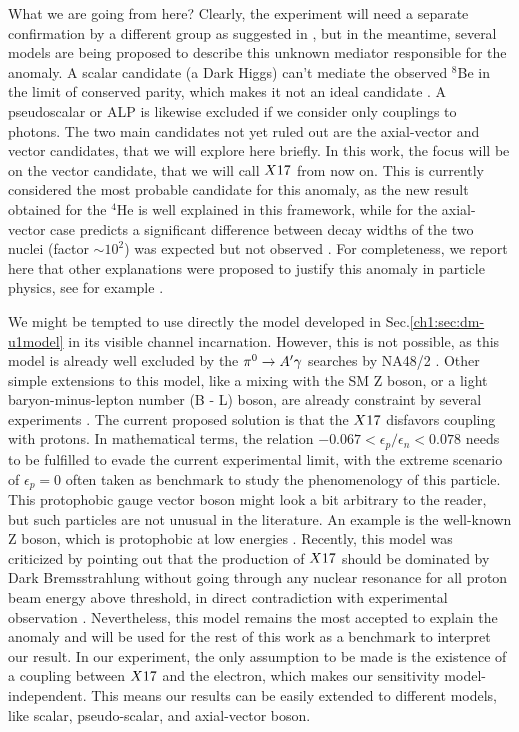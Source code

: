 What we are going from here? Clearly, the experiment will need a separate confirmation by a different group as suggested in \cite{Feng:2020mbt}, but in the meantime, several models are being proposed to describe this unknown mediator responsible for the anomaly. A scalar candidate (a Dark Higgs) can't mediate the observed $^8$Be in the limit of conserved parity, which makes it not an ideal candidate \cite{PhysRevD.95.035017}. A pseudoscalar or ALP is likewise excluded if we consider only couplings to photons. The two main candidates not yet ruled out are the axial-vector and vector candidates, that we will explore here briefly. In this work, the focus will be on the vector candidate, that we will call $X17$ from now on. This is currently considered the most probable candidate for this anomaly, as the new result obtained for the $^4$He is well explained in this framework, while for the axial-vector case predicts a significant difference between decay widths of the two nuclei (factor $\sim10^2$) was expected but not observed \cite{Feng:2020mbt}. For completeness, we report here that other explanations were proposed to justify this anomaly in particle physics, see for example \cite{Nam:2019osu, Seto:2016pks}.

We might be tempted to use directly the model developed in Sec.\ref{ch1:sec:dm-u1model} in its visible channel incarnation. However, this is not possible, as this model is already well excluded by the $\pi^0 \to A' \gamma$ searches by NA48/2 \cite{na48}. Other simple extensions to this model, like a mixing with the SM Z boson, or a light baryon-minus-lepton number (B - L) boson, are already constraint by several experiments \cite{PhysRevD.95.035017}. The current proposed solution is that the $X17$ disfavors coupling with protons. In mathematical terms, the relation $-0.067 < \epsilon_p/\epsilon_n < 0.078$ needs to be fulfilled to evade the current experimental limit, with the extreme scenario of $\epsilon_p = 0$ often taken as benchmark to study the phenomenology of this particle. This protophobic gauge vector boson might look a bit arbitrary to the reader, but such particles are not unusual in the literature. An example is the well-known Z boson, which is protophobic at low energies \cite{PhysRevD.95.035017}. Recently, this model was criticized by pointing out that the production of $X17$ should be dominated by Dark Bremsstrahlung without going through any nuclear resonance for all proton beam energy above threshold, in direct contradiction with experimental observation \cite{zhang2020protophobic}. Nevertheless, this model remains the most accepted to explain the anomaly and will be used for the rest of this work as a benchmark to interpret our result. In our experiment, the only assumption to be made is the existence of a coupling between $X17$ and the electron, which makes our sensitivity model-independent. This means our results can be easily extended to different models, like scalar, pseudo-scalar, and axial-vector boson.


